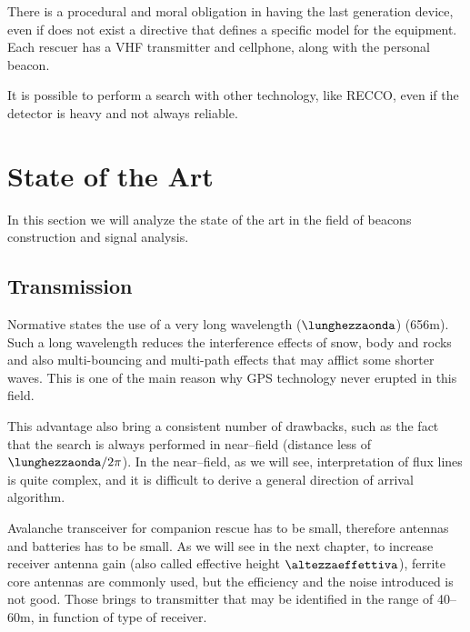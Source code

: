There is a procedural and moral obligation in having the last generation device, even if does not exist a directive that defines a specific model for the equipment. Each rescuer has a VHF transmitter and cellphone, along with the personal beacon. 

It is possible to perform a search with other technology, like RECCO, even if the detector is heavy and not always reliable.

\section{State of the Art}

In this section we will analyze the state of the art in the field of beacons construction and signal analysis.

\subsection{Transmission}

Normative states the use of a very long wavelength ($\lunghezzaonda$) (\num{656}\si{\meter}). Such a long wavelength reduces the interference effects of snow, body and rocks and also multi-bouncing and multi-path effects\citep{balanis2012antenna} that may afflict some shorter waves. This is one of the main reason why GPS technology never erupted in this field\citep{457andfuture}.

This advantage also bring a consistent number of drawbacks, such as the fact that the search is always performed in near--field (distance less of $\lunghezzaonda/2\pi$). In the near--field, as we will see, interpretation of flux lines is quite complex, and it is difficult to derive a general direction of arrival algorithm.

Avalanche transceiver for companion rescue has to be small, therefore antennas and batteries has to be small. As we will see in the next chapter, to increase receiver antenna gain (also called effective height $\altezzaeffettiva$), ferrite core antennas are commonly used, but the efficiency and the noise introduced is not good. Those brings to transmitter that may be identified in the range of \numrange{40}{60}\si{\meter}, in function of type of receiver.

